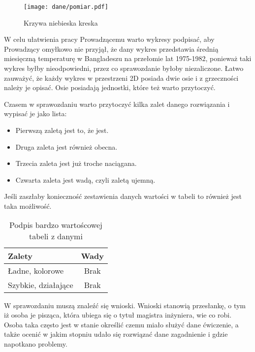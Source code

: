 \documentclass[a4paper,12pt]{article}
\newenvironment{lista}{
\begin{itemize}
  \setlength{\itemsep}{1pt}
  \setlength{\parskip}{0pt}
  \setlength{\parsep}{0pt}
}{\end{itemize}}
\begin{document}
\begin{wrapfigure}{r}{0.5\textwidth}
  \vspace{-20pt}
  \begin{center}
  \texttt{[image: dane/pomiar.pdf]}
  \end{center}
  \vspace{-20pt}
  \caption{Krzywa niebieska kreska}
  \vspace{-10pt}
\end{wrapfigure}


W celu ułatwienia pracy Prowadzącemu warto wykresy podpisać, aby Prowadzący omyłkowo nie przyjął, że dany wykres przedstawia średnią miesięczną temperaturę w Bangladeszu na przełomie lat 1975-1982, ponieważ taki wykres byłby nieodpowiedni, przez co sprawozdanie byłoby niezaliczone. Łatwo zauważyć, że każdy wykres w przestrzeni 2D posiada dwie osie i z grzeczności należy je opisać. Osie posiadają jednostki, które też warto przytoczyć.

Czasem w sprawozdaniu warto przytoczyć kilka zalet danego rozwiązania i wypisać je jako lista:
\begin{lista}
 \item Pierwszą zaletą jest to, że jest.
 \item Druga zaleta jest również obecna.
 \item Trzecia zaleta jest już troche naciągana.
 \item Czwarta zaleta jest wadą, czyli zaletą ujemną.
\end{lista}

Jeśli zaszłaby konieczność zestawienia danych wartości w tabeli to również jest taka możliwość.

\begin{table}[!hbp]
\centering
\begin{tabular}{|p{5cm}|c|}
\hline 
Zalety & Wady \tabularnewline
\hline 
 Ładne, kolorowe & Brak\tabularnewline
 Szybkie, działające & Brak\tabularnewline
\hline
\end{tabular}
\caption{Podpis bardzo wartoścowej tabeli z danymi}
\end{table}


W sprawozdaniu muszą znaleźć się wnioski. Wnioski stanowią przesłankę, o tym iż osoba je pisząca, która ubiega się o tytuł magistra inżyniera, wie co robi. Osoba taka często jest w stanie określić czemu miało służyć dane ćwiczenie, a także ocenić w jakim stopniu udało się rozwiązać dane zagadnienie i gdzie napotkano problemy.
\end{document}
